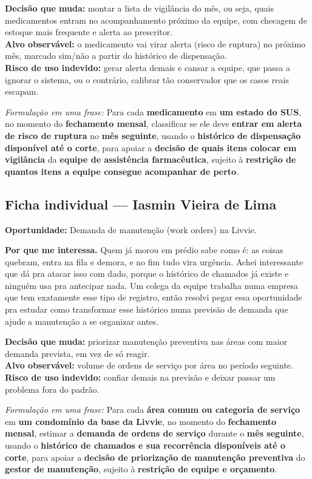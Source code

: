 \documentclass[11pt,a4paper]{article}
\begin{document}
\textbf{Decisão que muda:} montar a lista de vigilância do mês, ou seja, quais medicamentos entram no acompanhamento próximo da equipe, com checagem de estoque mais frequente e alerta ao prescritor.\\
\textbf{Alvo observável:} o medicamento vai virar alerta (risco de ruptura) no próximo mês, marcado sim/não a partir do histórico de dispensação.\\
\textbf{Risco de uso indevido:} gerar alerta demais e cansar a equipe, que passa a ignorar o sistema, ou o contrário, calibrar tão conservador que os casos reais escapam.

\textit{Formulação em uma frase:} Para cada \textbf{medicamento} em \textbf{um estado do SUS}, no momento do \textbf{fechamento mensal}, classificar se ele deve \textbf{entrar em alerta de risco de ruptura} no \textbf{mês seguinte}, usando o \textbf{histórico de dispensação disponível até o corte}, para apoiar a \textbf{decisão de quais itens colocar em vigilância} da \textbf{equipe de assistência farmacêutica}, sujeito à \textbf{restrição de quantos itens a equipe consegue acompanhar de perto}.

\vspace{6pt}
\subsection*{Ficha individual --- Iasmin Vieira de Lima}
\textbf{Oportunidade:} Demanda de manutenção (work orders) na Livvie.

\textbf{Por que me interessa.} Quem já morou em prédio sabe como é: as coisas quebram, entra na fila e demora, e no fim tudo vira urgência. Achei interessante que dá pra atacar isso com dado, porque o histórico de chamados já existe e ninguém usa pra antecipar nada. Um colega da equipe trabalha numa empresa que tem exatamente esse tipo de registro, então resolvi pegar essa oportunidade pra estudar como transformar esse histórico numa previsão de demanda que ajude a manutenção a se organizar antes.

\textbf{Decisão que muda:} priorizar manutenção preventiva nas áreas com maior demanda prevista, em vez de só reagir.\\
\textbf{Alvo observável:} volume de ordens de serviço por área no período seguinte.\\
\textbf{Risco de uso indevido:} confiar demais na previsão e deixar passar um problema fora do padrão.

\textit{Formulação em uma frase:} Para cada \textbf{área comum ou categoria de serviço} em \textbf{um condomínio da base da Livvie}, no momento do \textbf{fechamento mensal}, estimar a \textbf{demanda de ordens de serviço} durante o \textbf{mês seguinte}, usando o \textbf{histórico de chamados e sua recorrência disponíveis até o corte}, para apoiar a \textbf{decisão de priorização de manutenção preventiva} do \textbf{gestor de manutenção}, sujeito à \textbf{restrição de equipe e orçamento}.
\end{document}
